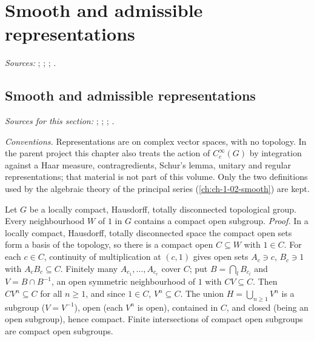 
\chapter{Smooth and admissible representations}\label{ch:ch-0-10-reps}

\noindent\emph{Sources:} \cite[§§2--3]{Cas-p}; \cite{Bern}; \cite[§§1, 5]{JL}; \cite{Corv-ptII-3}.

\section{Smooth and admissible representations}\label{sec:rep-smooth}

\noindent\emph{Sources for this section:} \cite[§§1--2]{JL}; \cite[§§2.1--2.2]{Cas-p}; \cite[§§1--2]{BZ}; \cite{Bern}.

\emph{Conventions.} Representations are on complex vector spaces, with no topology. In the parent project this chapter also
treats the action of $C_c^\infty(G)$ by integration against a Haar measure, contragredients, Schur's lemma, unitary and regular
representations; that material is not part of this volume. Only the two definitions used by the algebraic theory of the principal
series (\cref{ch:ch-1-02-smooth}) are kept.

\begin{remark}\label{rem:van-dantzig}
Let $G$ be a locally compact, Hausdorff, totally disconnected topological group.
Every neighbourhood $W$ of $1$ in $G$ contains a compact open subgroup. \emph{Proof.} In a locally compact, Hausdorff,
totally disconnected space the compact open sets form a basis of the topology, so there is a compact open $C\subseteq W$
with $1\in C$. For each $c\in C$, continuity of multiplication at $(c,1)$ gives open sets $A_c\ni c$, $B_c\ni1$ with
$A_cB_c\subseteq C$. Finitely many $A_{c_1},\dots,A_{c_r}$ cover $C$; put $B=\bigcap_lB_{c_l}$ and $V=B\cap B^{-1}$, an open
symmetric neighbourhood of $1$ with $CV\subseteq C$. Then $CV^n\subseteq C$ for all $n\ge1$, and since $1\in C$, $V^n\subseteq C$.
The union $H=\bigcup_{n\ge1}V^n$ is a subgroup ($V=V^{-1}$), open (each $V^n$ is open), contained in $C$, and closed (being an
open subgroup), hence compact. Finite intersections of compact open subgroups are compact open subgroups.
\end{remark}

